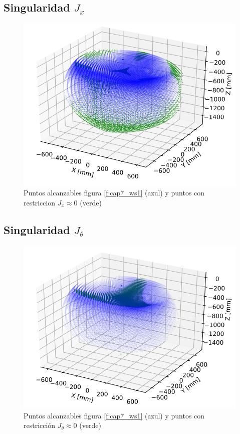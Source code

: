     \newpage
    
    \subsection{Singularidad $J_{x}$}
        \begin{figure}[h]
            \centering
            \includegraphics[width=0.65\linewidth]{Main/Chapter7/Images7/ws_4.png}
            \caption{Puntos alcanzables figura \ref{f:cap7_ws1} (azul) y puntos con restriccion $J_{x}\approx0$ (verde) }
            \label{f:cap7_ws4}
        \end{figure}  
    
    \subsection{Singularidad $J_{\theta}$}
        \begin{figure}[h]
            \centering
            \includegraphics[width=0.65\linewidth]{Main/Chapter7/Images7/ws_5.png}
            \caption{Puntos alcanzables figura \ref{f:cap7_ws1} (azul) y puntos con restricción $J_{\theta}\approx0$ (verde) }
            \label{f:cap7_ws5}
        \end{figure}  
        
